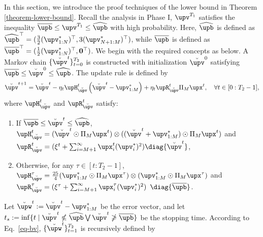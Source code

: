 In this section, we introduce the proof techniques of the lower bound in Theorem \ref{theorem-lower-bound}. Recall the analysis in Phase I, $\upv^{T_1}$ satisfies the inequality $\overline{\upb} \leq \upv^{T_1} \leq \widehat{\upb}$ with high probability. Here, $\widehat{\upb}$ is defined as $\widehat{\upb}^{\top}=(\frac{3}{2}(\upv_{1:N}^*)^{\top},3(\upv_{N+1:M}^*)^{\top})$, while $\overline{\upb}$ is defined as $\overline{\upb}^{\top}=(\frac{1}{2}(\upv_{1:N}^*)^{\top},\mathbf{0}^{\top})$. We begin with the required concepts as below. A Markov chain $\{\breve{\upv}^t\}_{t=0}^{T_2}$ is constructed with initialization $\breve{\upv}^0$ satisfying $\overline{\upb} \leq \breve{\upv}^0 \leq \widehat{\upb}$. The update rule is defined by
\begin{align}\label{eq-bv}
     \breve{\upv}^{t+1}=\breve{\upv}^t-\eta_t\upH_{\breve{\upv}}^t\left(\breve{\upv}^t-\upv_{1:M}^*\right)+\eta_t\upR_{\breve{\upv}}^t\Pi_M\upx^t, \quad \forall t\in[0:T_2-1],\notag
\end{align}
where $\upH_{\breve{\upv}}^{t}$ and $\upR_{\breve{\upv}}^t$ satisfy: 
\begin{enumerate}
    \item If $\overline{\upb}\leq\breve{\upv}^t\leq\widehat{\upb}$, $\upH_{\breve{\upv}}^{t}=(\breve{\upv}^t\odot\Pi_M\upx^t)\otimes((\breve{\upv}^t+\upv_{1:M}^*)\odot\Pi_M\upx^t)$ and $\upR_{\breve{\upv}}^t=(\xi^t+\sum_{i=M+1}^{\infty}\upx_i^t(\upv_i^*)^2)\diag\{\breve{\upv}^t\}$,
    \item Otherwise, for any $\tau\in[t:T_2-1]$,  $\upH_{\breve{\upv}}^{\tau}=\frac{25}{4}(\upv_{1:M}^*\odot\Pi_{M}\upx^{\tau})\otimes(\upv_{1:M}^*\odot\Pi_{M}\upx^{\tau})$ and $\upR_{\breve{\upv}}^{\tau}=(\xi^{\tau}+\sum_{i=M+1}^{\infty}\upx_i^{\tau}(\upv_i^*)^2)$ $\diag\{\overline{\upb}\}$.
\end{enumerate}
Let $\breve{\upw}^t:=\breve{\upv}^t-\upv_{1:M}^*$ be the error vector, and let $t_s:=\inf\{t\mid \breve{\upv}^t\nleqslant\widehat{\upb}\bigvee\breve{\upv}^t\ngeqslant\overline{\upb}\}$ be the stopping time. According to Eq.~\eqref{eq-bv}, $\{\breve{\upw}^t\}_{t=1}^{T_2}$ is recursively defined by
